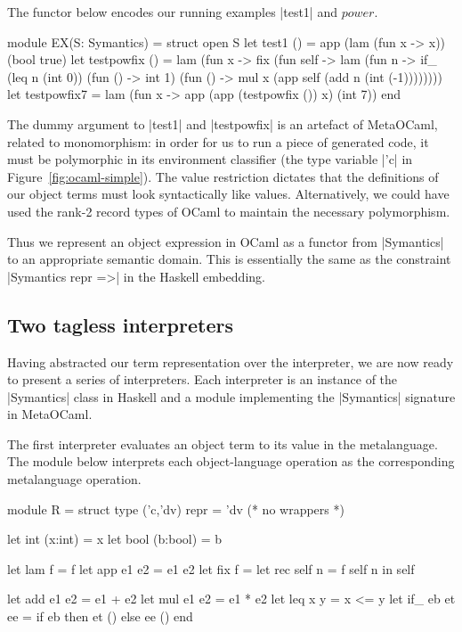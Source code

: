 \documentclass[preprint]{sigplanconf}
\begin{document}
The functor below encodes our running examples |test1| and $\mathit{power}$.
\begin{code}
module EX(S: Symantics) = struct
  open S
  let test1 () =
    app (lam (fun x -> x)) (bool true)
  let testpowfix () = 
    lam (fun x -> fix (fun self -> lam (fun n ->
    if_ (leq n (int 0)) (fun () -> int 1)
        (fun () -> mul x
          (app self (add n (int (-1))))))))
  let testpowfix7 = 
     lam (fun x -> app (app (testpowfix ()) x)
                       (int 7))
end
\end{code}
The dummy argument to |test1| and |testpowfix| is an artefact of
MetaOCaml, related to monomorphism: in order for us to run a
piece of generated code, it must be polymorphic in its environment
classifier (the type variable |'c| in Figure~\ref{fig:ocaml-simple}).
The value restriction dictates that
the definitions of our object terms must look syntactically like
values. Alternatively, we could have used
the rank-2 record types of OCaml to maintain the necessary polymorphism.

Thus we represent an object expression in
OCaml as a functor from |Symantics| to an appropriate semantic domain. This
is essentially the same as the constraint |Symantics repr =>| in the
Haskell embedding.

\subsection{Two tagless interpreters}
\label{S:interpreter-RL}

Having abstracted our term representation over the interpreter, we are
now ready to present a series of interpreters.  Each interpreter is an
instance of the |Symantics| class in Haskell and a module implementing
the |Symantics| signature in MetaOCaml.

The first interpreter evaluates an object term to its value in the
metalanguage.  The module below interprets each object\hyp language
operation as the corresponding metalanguage operation.
\begin{code}
module R = struct
  type ('c,'dv) repr = 'dv (* no wrappers *)

  let int  (x:int)  = x
  let bool (b:bool) = b

  let lam  f        = f
  let app  e1 e2    = e1 e2
  let fix  f        =
    let rec self n = f self n in self

  let add  e1 e2    = e1 + e2
  let mul  e1 e2    = e1 * e2
  let leq  x y      = x <= y
  let if_  eb et ee = if eb then et () else ee ()
end
\end{code}
\end{document}
